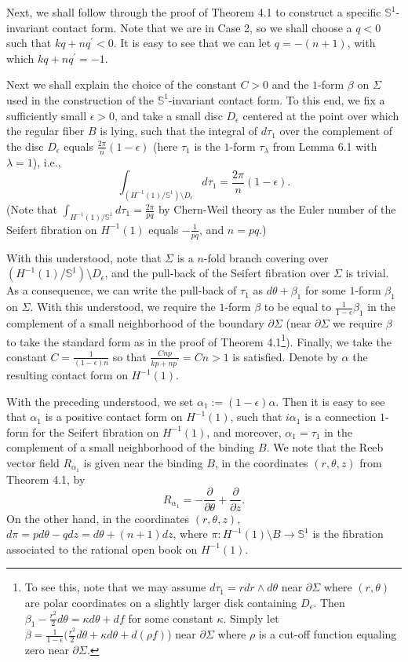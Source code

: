 \documentclass[11pt]{amsart}
\theoremstyle{plain}
\numberwithin{theorem}{section}
\theoremstyle{definition}
\newcommand{\s}{{\mathbb S}}
\begin{document}
Next, we shall follow through the proof of Theorem 4.1 to construct a specific $\s^1$-invariant contact form. Note that we are in Case 2, so we shall choose a $q<0$ such that $kq+nq^\prime<0$. It is easy to see that we can let
$q=-(n+1)$, with which $kq+nq^\prime=-1$.

Next we shall explain the choice of the constant $C>0$ and the $1$-form $\beta$ on $\Sigma$ used in
the construction of the $\s^1$-invariant contact form. To this end, we fix a sufficiently small $\epsilon>0$, 
and take a small disc $D_\epsilon$ centered at the point over which the regular fiber $B$ is lying, such that the integral of $d\tau_1$ over the complement of the disc $D_\epsilon$ equals 
$\frac{2\pi}{n}(1-\epsilon)$ (here $\tau_1$ is the $1$-form $\tau_\lambda$ from Lemma 6.1 
with $\lambda=1$),  i.e.,
$$
\int_{(H^{-1}(1)/\s^1)\setminus D_\epsilon} d\tau_1=\frac{2\pi}{n}(1-\epsilon).
$$
(Note that $\int_{H^{-1}(1)/\s^1} d\tau_1=\frac{2\pi}{pq}$ by Chern-Weil theory as the Euler number of the Seifert fibration on $H^{-1}(1)$ equals $-\frac{1}{pq}$, and $n=pq$.)

With this understood, note that $\Sigma$ is a $n$-fold branch covering over 
$(H^{-1}(1)/\s^1)\setminus D_\epsilon$, and the pull-back of the Seifert fibration over $\Sigma$ is
trivial. As a consequence, we can write the pull-back of $\tau_1$ as $d\theta+\beta_1$ for
some $1$-form $\beta_1$ on $\Sigma$. With this understood, we require the $1$-form $\beta$ to be equal to $\frac{1}{1-\epsilon}\beta_1$ in the complement of a small neighborhood of the boundary 
$\partial\Sigma$ (near $\partial \Sigma$ we require $\beta$ to take the standard form as 
in the proof of Theorem 4.1\footnote{To see this, note that we may assume $d\tau_1=rdr\wedge d\theta$ near $\partial \Sigma$ where $(r,\theta)$ are polar coordinates on a slightly larger disk containing $D_\epsilon$. Then $\beta_1-\frac{r^2}{2} d\theta=\kappa d\theta+ df$ for some 
constant $\kappa$. Simply let $\beta=\frac{1}{1-\epsilon}(\frac{r^2}{2} d\theta+\kappa d\theta+
d(\rho f)$) near $\partial \Sigma$ where $\rho$ is a cut-off function equaling zero near $\partial \Sigma$.}). 
Finally, we take the constant $C=\frac{1}{(1-\epsilon)n}$ so that 
$\frac{Cnp}{kp+np^\prime}=Cn>1$ is satisfied. Denote by $\alpha$ the resulting contact form on $H^{-1}(1)$.

With the preceding understood, we set $\alpha_1:=(1-\epsilon)\alpha$. Then it is easy to see that
$\alpha_1$ is a positive contact form on $H^{-1}(1)$, such that $i\alpha_1$ is a connection $1$-form 
for the Seifert fibration on $H^{-1}(1)$, and moreover, $\alpha_1=\tau_1$ in the complement of a
small neighborhood of the binding $B$. We note that the Reeb vector field $R_{\alpha_1}$ is given 
near the binding $B$, in the coordinates $(r,\theta,z)$ from Theorem 4.1, by
$$
R_{\alpha_1}=-\frac{\partial}{\partial \theta}+\frac{\partial}{\partial z}.
$$
On the other hand, in the coordinates $(r,\theta,z)$, $d\pi=pd\theta-q dz=d\theta+(n+1) dz$, where 
$\pi: H^{-1}(1)\setminus B\rightarrow \s^1$ is the fibration associated to the rational open book on $H^{-1}(1)$.
\end{document}
